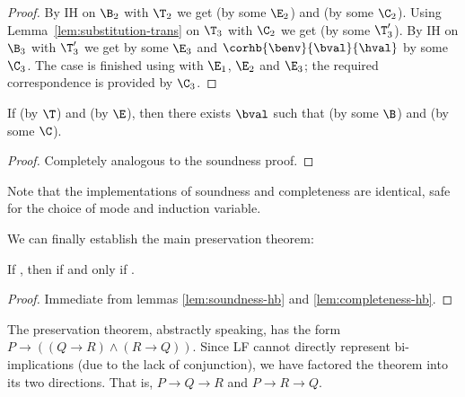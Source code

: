 \begin{proof}
By IH on $\B_2$ with $\T_2$ we get  (by some $\E_2$) and  (by some $\C_2$).
Using Lemma~\ref{lem:substitution-trans} on $\T_3$ with $\C_2$ we get  (by some $\T_3'$).
By IH on $\B_3$ with $\T_3'$ we get  by some $\E_3$ and $\corhb{\benv}{\bval}{\hval}$ by some $\C_3$.
The case is finished using  with $\E_1$, $\E_2$ and $\E_3$; the required correspondence is provided by $\C_3$.

\end{proof}

\begin{lemma}[Completeness]
\label{lem:completeness-hb}
If \trahb{\benv}{\envnil}{\hexp}{\bexp} (by $\T$) and \hev{\hexp}{\hval} (by $\E$), then there exists $\bval$ such that \bev{\benv}{\bexp}{\bval} (by some $\B$) and \corhb{\benv}{\bval}{\hval} (by some $\C$).
\end{lemma}


\begin{proof}
Completely analogous to the soundness proof.
\end{proof}

\Twelf
Note that the implementations of soundness and completeness are identical, safe for the choice of mode and induction variable.

\vspace{0.5cm}

\noindent We can finally establish the main preservation theorem:

\begin{theorem}
\label{thm:preservation-hb} If \trahb{\envnil}{\envnil}{\bexp}{\hexp}, then \hev{\hexp}{\n{\nat}} if and only if \bev{\envnil}{\bexp}{\n{\nat}}.
\end{theorem}


\begin{proof}
Immediate from lemmas \ref{lem:soundness-hb} and \ref{lem:completeness-hb}.
\end{proof}

\Twelf
The preservation theorem, abstractly speaking, has the form $P \rightarrow ((Q \rightarrow R) \wedge (R \rightarrow Q))$.
Since LF cannot directly represent bi-implications (due to the lack of conjunction), we have factored the theorem into its two directions.
That is, $P \rightarrow Q \rightarrow R$ and $P \rightarrow R \rightarrow Q$.

